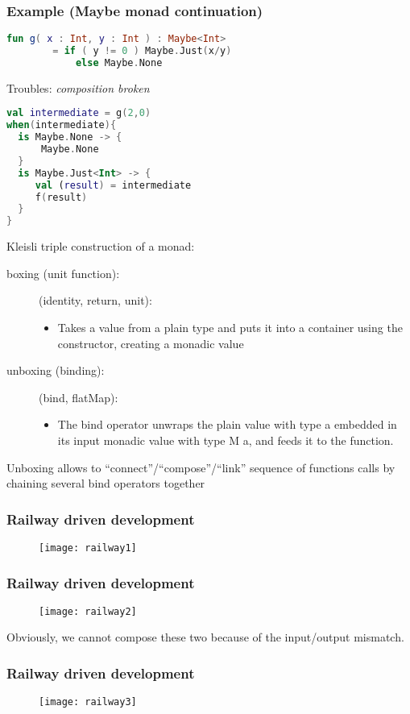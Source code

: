 \documentclass[10pt]{beamer}
\begin{document}
\begin{frame}[fragile]
\frametitle{Example (Maybe monad continuation)}
\begin{lstlisting}[language=Kotlin, basicstyle=\ttfamily]
fun g( x : Int, y : Int ) : Maybe<Int>
        = if ( y != 0 ) Maybe.Just(x/y)
            else Maybe.None
\end{lstlisting}
Troubles: \emph{composition broken}
\begin{lstlisting}[language=Kotlin, basicstyle=\ttfamily]
val intermediate = g(2,0)
when(intermediate){
  is Maybe.None -> {
      Maybe.None
  }
  is Maybe.Just<Int> -> {
     val (result) = intermediate
     f(result)
  }
}    
\end{lstlisting}
\end{frame}
\begin{frame}[fragile]
	Kleisli triple construction of a monad:
	\begin{description}
		\item[boxing (unit function):] (identity, return, unit): 
			\begin{itemize}
				\item Takes a value from a plain type and puts it into a container using the constructor, creating a monadic value
			\end{itemize}
		\item [unboxing (binding):]  (bind, flatMap):
			\begin{itemize}
				\item 
					The bind operator unwraps the plain value with type a embedded in its input monadic value with type M a, and feeds it to the function.
			\end{itemize}
	\end{description}
			Unboxing allows to ``connect''/``compose''/``link'' sequence of functions  calls by chaining several bind operators together
\end{frame}
\begin{frame}\frametitle{Railway driven development}
	\begin{figure}
		\centering
		\texttt{[image: railway1]}
	\end{figure}
\end{frame}
\begin{frame}\frametitle{Railway driven development}
	\begin{figure}
		\centering
		\texttt{[image: railway2]}
	\end{figure}
	Obviously, we cannot compose these two because of the input/output mismatch.
\end{frame}
\begin{frame}\frametitle{Railway driven development}
	\begin{figure}
		\centering
		\texttt{[image: railway3]}
	\end{figure}
\end{frame}
\end{document}
